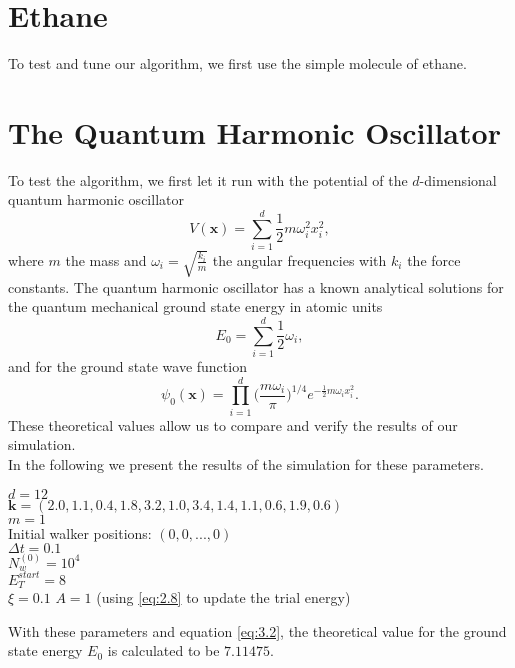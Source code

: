 \documentclass [12pt]{report}
\begin{document}
\section{Ethane}
To test and tune our algorithm, we first use the simple molecule of ethane.
\section{The Quantum Harmonic Oscillator}
To test the algorithm, we first let it run with the potential of the $d$-dimensional quantum harmonic oscillator
\begin{equation}\label{eq:3.1} 
V(\bm{x}) = \sum_{i=1}^d \frac{1}{2} m \omega_i^2 x_i^2,
\end{equation}
where $m$ the mass and $\omega_i = \sqrt{\frac{k_i}{m}}$ the angular frequencies with $k_i$ the force constants. The quantum harmonic oscillator has a known analytical solutions for the quantum mechanical ground state energy in atomic units
\begin{equation}\label{eq:3.2} 
E_0 = \sum_{i=1}^d \frac{1}{2}\omega_i,
\end{equation}
and for the ground state wave function
\begin{equation}\label{eq:3.3} 
\psi_0(\bm{x}) = \prod_{i=1}^d \biggl(\frac{m \omega_i}{\pi}\biggr)^{1/4} e^{-\frac{1}{2} m \omega_i x_i^2}.
\end{equation}
These theoretical values allow us to compare and verify the results of our simulation.\\
In the following we present the results of the simulation for these parameters.

\begin{addmargin}[1cm]{1cm}
$d = 12$ \\
$\bm{k} = (2.0,  1.1,  0.4,  1.8,  3.2,  1.0,  3.4,  1.4,  1.1,  0.6,  1.9,  0.6 )$\\
$m =1$ \\
Initial walker positions: $(0,0,...,0)$\\
$\Delta t = 0.1$ \\
$N_w^{(0)} = 10^4$ \\
$E_T^{start} = 8$\\
$\xi = 0.1$
$A = 1$ (using \eqref{eq:2.8} to update the trial energy)\\
\end{addmargin}
With these parameters and equation \eqref{eq:3.2}, the theoretical value for the ground state energy $E_0$ is calculated to be $7.11475$.
\end{document}

